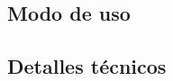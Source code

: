 \documentclass[a4paper]{article}
\begin{document}
\subsection{Modo de uso}


\subsection{Detalles técnicos}

\end{document}
